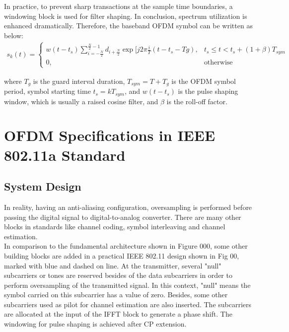 In practice, to prevent sharp transactions at the sample time boundaries, a windowing block is used for filter shaping. In conclusion, spectrum utilization is enhanced dramatically. Therefore, the baseband OFDM symbol can be written as below:\\
\begin{equation} \label{ofdm_window}
\begin{split}
s_{k}(t)=
\left\{
	\begin{array}{ll}
	w(t - t_{s})\sum\limits_{i=-\frac{N}{2}}^{\frac{N}{2}-1} d_{i+\frac{N}{2}} \exp\lbrack j2\pi\frac{i}{T}(t- t_{s}- T{g}) , & t_{s}\le t < t_{s} + (1+\beta)T_{sym}\\
	0, & \mbox{otherwise}
	\end{array}
\right.
\end{split}
\end{equation}

where $T_{g}$ is the guard interval duration, $T_{sym}= T+ T_{g}$ is the OFDM symbol period,
symbol starting time $t_{s}= kT_{sym}$, and $w(t-t_{s})$ is the pulse shaping window, which is
usually a raised cosine filter, and $\beta$ is the roll-off factor.\\


\section{OFDM Specifications in IEEE 802.11a Standard}
\subsection{System Design}

In reality, having an anti-aliasing configuration, oversampling is performed before passing the digital signal to digital-to-analog converter. There are many other blocks in standards like channel coding, symbol interleaving and channel estimation.\\
In comparison to the fundamental architecture shown in Figure 000, some other building blocks are added in a practical IEEE 802.11 design shown in Fig 00, marked with blue and dashed on line. At the transmitter, several "null" subcarriers or tones are reserved besides of the data subcarriers in order to perform oversampling of the transmitted signal. In this context, "null" means the symbol carried on this subcarrier has a value of zero. Besides, some other subcarriers used as pilot for channel estimation are also inserted. The subcarriers are allocated at the input of the IFFT block to generate a phase shift. The windowing for pulse shaping is achieved after CP extension.\\


